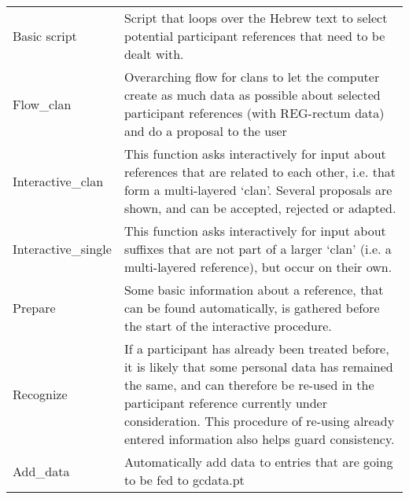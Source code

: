 \documentclass{report}
\begin{document}

\begin{tabularx}{\textwidth}{lX}
Basic script & Script that loops over the Hebrew text to select potential participant references that need to be dealt with.\\
Flow\_clan & Overarching flow for clans to let the computer create as much data as possible about selected participant references (with REG-rectum data) and do a proposal to the user \\
Interactive\_clan & This function asks interactively for input about references that are related to each other, i.e. that form a multi-layered `clan'. Several proposals are shown, and can be accepted, rejected or adapted. \\
Interactive\_single & This function asks interactively for input about suffixes that are not part of a larger `clan' (i.e. a multi-layered reference), but occur on their own. \\
Prepare & Some basic information about a reference, that can be found automatically, is gathered before the start of the interactive procedure.\\
Recognize & If a participant has already been treated before, it is likely that some personal data has remained the same, and can therefore be re-used in the participant reference currently under consideration. This procedure of re-using already entered information also helps guard consistency. \\
Add\_data & Automatically add data to entries that are going to be fed to gcdata.pt \\
\end{tabularx}
\end{document}
